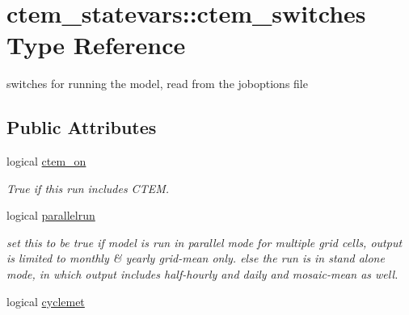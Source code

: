 \hypertarget{structctem__statevars_1_1ctem__switches}{}\section{ctem\+\_\+statevars\+:\+:ctem\+\_\+switches Type Reference}
\label{structctem__statevars_1_1ctem__switches}


switches for running the model, read from the joboptions file  


\subsection*{Public Attributes}
\begin{DoxyCompactItemize}
\item 
\hypertarget{structctem__statevars_1_1ctem__switches_a92cbf55d7a151de6b5d0fd6164812f8f}{}logical \hyperlink{structctem__statevars_1_1ctem__switches_a92cbf55d7a151de6b5d0fd6164812f8f}{ctem\+\_\+on}\label{structctem__statevars_1_1ctem__switches_a92cbf55d7a151de6b5d0fd6164812f8f}

\begin{DoxyCompactList}\small\item\em True if this run includes C\+T\+E\+M. \end{DoxyCompactList}\item 
\hypertarget{structctem__statevars_1_1ctem__switches_afbae9ce730b0e1b97da241cecd3fe7a3}{}logical \hyperlink{structctem__statevars_1_1ctem__switches_afbae9ce730b0e1b97da241cecd3fe7a3}{parallelrun}\label{structctem__statevars_1_1ctem__switches_afbae9ce730b0e1b97da241cecd3fe7a3}

\begin{DoxyCompactList}\small\item\em set this to be true if model is run in parallel mode for multiple grid cells, output is limited to monthly \& yearly grid-\/mean only. else the run is in stand alone mode, in which output includes half-\/hourly and daily and mosaic-\/mean as well. \end{DoxyCompactList}\item 
\hypertarget{structctem__statevars_1_1ctem__switches_a4050812675cede871eb31ce2605868e2}{}logical \hyperlink{structctem__statevars_1_1ctem__switches_a4050812675cede871eb31ce2605868e2}{cyclemet}\label{structctem__statevars_1_1ctem__switches_a4050812675cede871eb31ce2605868e2}


\end{DoxyCompactItemize}
